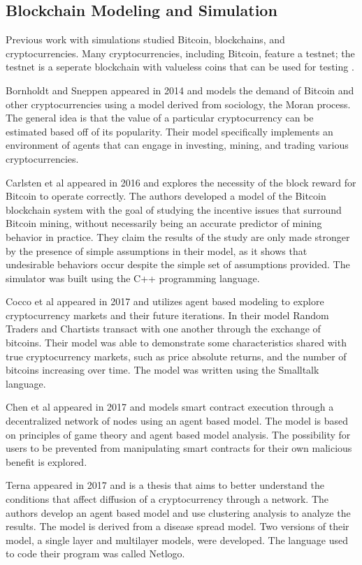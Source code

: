 \documentclass[12pt]{report}
\begin{document}
\subsection{Blockchain Modeling and Simulation}
Previous work with simulations studied Bitcoin, blockchains, and cryptocurrencies. Many cryptocurrencies, including Bitcoin, feature a testnet; the testnet is a seperate blockchain with valueless coins that can be used for testing \cite{bitcoinwiki.}.

Bornholdt and Sneppen \cite{Bornholdt.2014} appeared in 2014 and models the demand of Bitcoin and other cryptocurrencies using a model derived from sociology, the Moran process. The general idea is that the value of a particular cryptocurrency can be estimated based off of its popularity. Their model specifically implements an environment of agents that can engage in investing, mining, and trading various cryptocurrencies.

Carlsten et al \cite{Carlsten.2016} appeared in 2016 and explores the necessity of the block reward for Bitcoin to operate correctly. The authors developed a model of the Bitcoin blockchain system with the goal of studying the incentive issues that surround Bitcoin mining, without necessarily being an accurate predictor of mining behavior in practice. They claim the results of the study are only made stronger by the presence of simple assumptions in their model, as it shows that undesirable behaviors occur despite the simple set of assumptions provided. The simulator was built using the C++ programming language.

Cocco et al \cite{Cocco.2017} appeared in 2017 and utilizes agent based modeling to explore cryptocurrency markets and their future iterations. In their model Random Traders and Chartists transact with one another through the exchange of bitcoins. Their model was able to demonstrate some characteristics shared with true cryptocurrency markets, such as price absolute returns, and the number of bitcoins increasing over time. The model was written using the Smalltalk language.

Chen et al \cite{Chen.2017} appeared in 2017 and models smart contract execution through a decentralized network of nodes using an agent based model. The model is based on principles of game theory and agent based model analysis. The possibility for users to be prevented from manipulating smart contracts for their own malicious benefit is explored.

Terna \cite{Terna.} appeared in 2017 and is a thesis that aims to better understand the conditions that affect diffusion of a cryptocurrency through a network. The authors develop an agent based model and use clustering analysis to analyze the results. The model is derived from a disease spread model. Two versions of their model, a single layer and multilayer models, were developed. The language used to code their program was called Netlogo.
\end{document}
